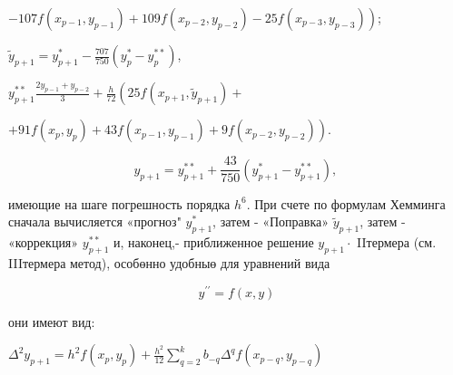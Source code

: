 \documentclass[10pt]{article}
\begin{document}
$\left.-107 f\left(x_{p-1}, y_{p-1}\right)+109 f\left(x_{p-2}, y_{p-2}\right)-25 f\left(x_{p-3}, y_{p-3}\right)\right)$;



$\tilde{y}_{p+1}=y_{p+1}^{*}-\frac{707}{750}\left(y_{p}^{*}-y_{p}^{* *}\right)$,



$y_{p+1}^{* *} \frac{2 y_{p-1}+y_{p-2}}{3}+\frac{h}{72}\left(25 f\left(x_{p+1}, \tilde{y}_{p+1}\right)+\right.$



$\left.+91 f\left(x_{p}, y_{p}\right)+43 f\left(x_{p-1}, y_{p-1}\right)+9 f\left(x_{p-2}, y_{p-2}\right)\right)$.



\[

y_{p+1}=y_{p+1}^{* *}+\frac{43}{750}\left(y_{p+1}^{*}-y_{p+1}^{* *}\right) \text {, }

\]



имеющие на шаге погрешность порядка $h^{6}$. При счете по формулам Хемминга сначала вычисляется «прогноз" $y_{p+1}^{*}$, затем - «Поправка» $\tilde{y}_{p+1}$, затем - «коррекция» $y_{p+1}^{* *}$ и, наконец,- приближенное решение $y_{p+1} \cdot$ IIтермера (см. IIIтермера метод), особөнно удобныө для уравнений вида



\[

y^{\prime \prime}=f(x, y)

\]



они имеют вид:



$\Delta^{2} y_{p+1}=h^{2} f\left(x_{p}, y_{p}\right)+\frac{h^{2}}{12} \sum_{q=2}^{k} b_{-q} \Delta^{q} f\left(x_{p-q}, y_{p-q}\right)$
\end{document}
